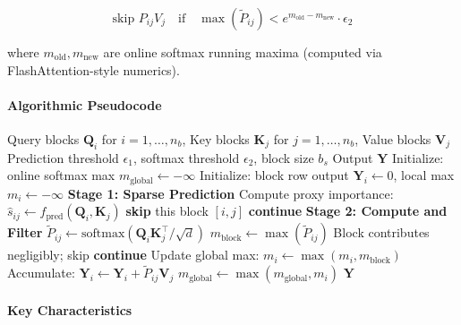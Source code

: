 \[
\text{skip } P_{ij} V_j \quad \text{if} \quad \max(\tilde{P}_{ij}) < e^{m_{\text{old}} - m_{\text{new}}} \cdot \epsilon_2
\]

where $m_{\text{old}}, m_{\text{new}}$ are online softmax running maxima (computed via FlashAttention-style numerics).

\paragraph{Algorithmic Pseudocode}

\begin{algorithm}[H]
\caption{SpargeAttn: Two-Stage Block-Sparse Filtering}
\begin{algorithmic}[1]
\Require Query blocks $\mathbf{Q}_i$ for $i = 1, \ldots, n_b$, Key blocks $\mathbf{K}_j$ for $j = 1, \ldots, n_b$, Value blocks $\mathbf{V}_j$
\Require Prediction threshold $\epsilon_1$, softmax threshold $\epsilon_2$, block size $b_s$
\Ensure Output $\mathbf{Y}$
\State Initialize: online softmax max $m_{\text{global}} \gets -\infty$
    \State Initialize: block row output $\mathbf{Y}_i \gets 0$, local max $m_i \gets -\infty$
        \State \textbf{Stage 1: Sparse Prediction}
        \State Compute proxy importance: $\hat{s}_{ij} \gets f_{\text{pred}}(\mathbf{Q}_i, \mathbf{K}_j)$
            \State \textbf{skip} this block $[i,j]$  
            \State \textbf{continue} 
        \EndIf
        \State \textbf{Stage 2: Compute and Filter}
        \State $\tilde{P}_{ij} \gets \text{softmax}(\mathbf{Q}_i \mathbf{K}_j^\top / \sqrt{d})$
        \State $m_{\text{block}} \gets \max(\tilde{P}_{ij})$
            \State Block contributes negligibly; skip  
            \State \textbf{continue}
        \EndIf
        \State Update global max: $m_i \gets \max(m_i, m_{\text{block}})$
        \State Accumulate: $\mathbf{Y}_i \gets \mathbf{Y}_i + \tilde{P}_{ij} \mathbf{V}_j$
    \EndFor
    \State $m_{\text{global}} \gets \max(m_{\text{global}}, m_i)$
\EndFor
\Return $\mathbf{Y}$
\end{algorithmic}
\end{algorithm}

\paragraph{Key Characteristics}

